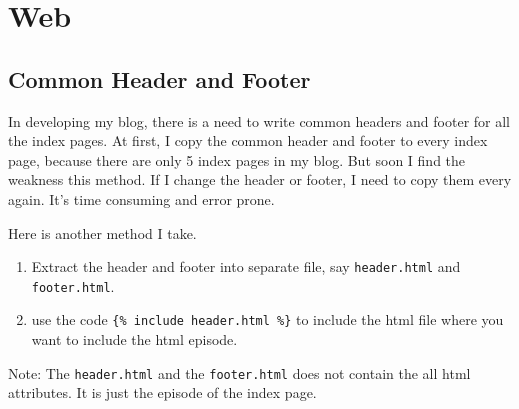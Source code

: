 
\chapter{Web}

\section{Common Header and Footer}

In developing my blog, there is a need to write common headers and footer for all the index pages.
At first, I copy the common header and footer to every index page, because there are only 5 index pages in my blog.
But soon I find the weakness this method.
If I change the header or footer, I need to copy them every again.
It's time consuming and error prone.

Here is another method I take.
\begin{enumerate}
\item Extract the header and footer into separate file, say \verb|header.html| and \verb|footer.html|.
\item use the code \verb|{% include header.html %}| to include the html file where you want to include the html episode.
\end{enumerate}


\begin{tcolorbox}
  Note:
  The \verb|header.html| and the \verb|footer.html| does not contain the all html attributes.
  It is just the episode of the index page.
\end{tcolorbox}